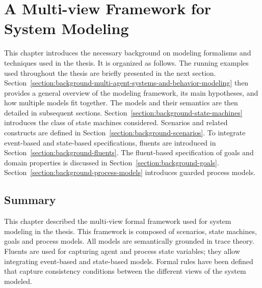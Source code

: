 \chapter{A Multi-view Framework for System Modeling\label{chapter:framework}}

This chapter introduces the necessary background on modeling formalisms and techniques used in the thesis. It is organized as follows. The running examples used throughout the thesis are briefly presented in the next section. Section~\ref{section:background-multi-agent-systems-and-behavior-modeling} then provides a general overview of the modeling framework, its main hypotheses, and how multiple models fit together. The models and their semantics are then detailed in subsequent sections. Section~\ref{section:background-state-machines} introduces the class of state machines considered. Scenarios and related constructs are defined in Section~\ref{section:background-scenarios}. To integrate event-based and state-based specifications, fluents are introduced in Section~\ref{section:background-fluents}. The fluent-based specification of goals and domain properties is discussed in Section~\ref{section:background-goals}. Section~\ref{section:background-process-models} introduces guarded process models.









\section*{Summary}

This chapter described the multi-view formal framework used for system modeling in the thesis. This framework is composed of scenarios, state machines, goals and process models. All models are semantically grounded in trace theory. Fluents are used for capturing agent and process state variables; they allow integrating event-based and state-based models. Formal rules have been defined that capture consistency conditions between the different views of the system modeled.
